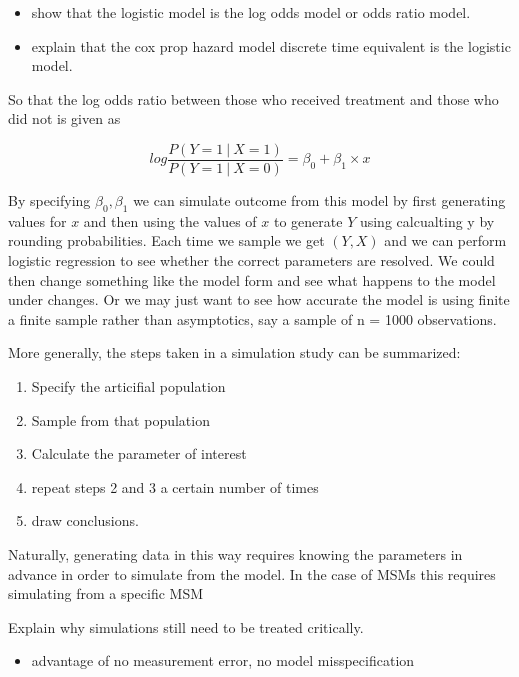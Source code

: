 \documentclass[11pt]{article}
\providecommand{\tightlist}{%
      \setlength{\itemsep}{0pt}\setlength{\parskip}{0pt}}
\begin{document}
\begin{itemize}
\tightlist
\item
  show that the logistic model is the log odds model or odds ratio
  model.
\item
  explain that the cox prop hazard model discrete time equivalent is the
  logistic model.
\end{itemize}

So that the log odds ratio between those who received treatment and
those who did not is given as

\[log \frac{P(Y = 1\ |\ X = 1)}{P(Y = 1\ |\ X = 0)} = \beta_0 + \beta_1 \times x \]

By specifying \({\beta_0, \beta_1}\) we can simulate outcome from this
model by first generating values for \(x\) and then using the values of
\(x\) to generate \(Y\) using calcualting y by rounding probabilities.
Each time we sample we get \((Y, X)\) and we can perform logistic
regression to see whether the correct parameters are resolved. We could
then change something like the model form and see what happens to the
model under changes. Or we may just want to see how accurate the model
is using finite a finite sample rather than asymptotics, say a sample of
n = 1000 observations.

More generally, the steps taken in a simulation study can be summarized:

\begin{enumerate}
\def\labelenumi{\arabic{enumi}.}
\tightlist
\item
  Specify the articifial population
\item
  Sample from that population
\item
  Calculate the parameter of interest
\item
  repeat steps 2 and 3 a certain number of times
\item
  draw conclusions.
\end{enumerate}

Naturally, generating data in this way requires knowing the parameters
in advance in order to simulate from the model. In the case of MSMs this
requires simulating from a specific MSM

Explain why simulations still need to be treated critically.
\citet{Greenland1997}

\begin{itemize}
\tightlist
\item
  advantage of no measurement error, no model misspecification
\end{itemize}
\end{document}
